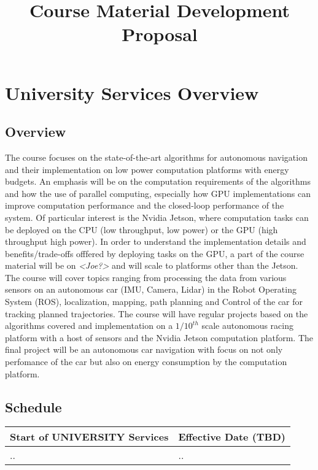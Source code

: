 \documentclass{article}[14pt]
\title{Course Material Development Proposal}
\begin{document}
\maketitle
\section{University Services Overview}
\subsection{Overview}

The course focuses on the state-of-the-art algorithms for autonomous navigation and their implementation on low power computation platforms with energy budgets. An emphasis will be on the computation requirements of the algorithms and how the use of parallel computing, especially how GPU implementations can improve computation performance and the closed-loop performance of the system. Of particular interest is the Nvidia Jetson, where computation tasks can be deployed on the CPU (low throughput, low power) or the GPU (high throughput high power). In order to understand the implementation details and benefits/trade-offs offfered by deploying tasks on the GPU, a part of the course material will be on \emph{<Joe?>} and will scale to platforms other than the Jetson. The course will cover topics ranging from processing the data from various sensors on an autonomous car (IMU, Camera, Lidar) in the Robot Operating System (ROS), localization, mapping, path planning and Control of the car for tracking planned trajectories.  The course will have regular projects based on the algorithms covered and implementation on a $1/10^{th}$ scale autonomous racing platform with a host of sensors and the Nvidia Jetson computation platform. The final project will be an autonomous car navigation with focus on not only perfomance of the car but also on energy consumption by the computation platform.
\subsection{Schedule}

\begin{center}
\begin{tabular}{ | l | l |}
\hline
Start of UNIVERSITY Services & Effective Date (TBD) \\
\hline
.. & .. \\
\hline
\end{tabular}
\end{center}
\end{document}
